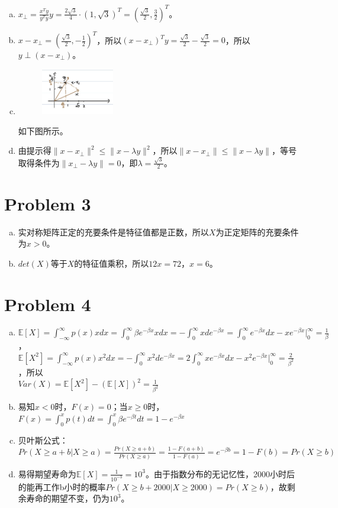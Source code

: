 \documentclass[a4paper,UTF8]{article}
\numberwithin{equation}{section}
\begin{document}
\begin{enumerate}[(a)]
	\item $x_{\perp}=\frac{x^Ty}{y^Ty}y=\frac{2\sqrt{3}}{4}\cdot(1,\sqrt{3})^T=(\frac{\sqrt{3}}{2},\frac{3}{2})^T$。
	\item $x-x_{\perp}=(\frac{\sqrt{3}}{2},-\frac{1}{2})^T$，所以$(x-x_{\perp})^Ty=\frac{\sqrt{3}}{2}-\frac{\sqrt{3}}{2}=0$，所以$y\perp (x-x_{\perp})$。
	\item \begin{figure}[b]
		\centering
		\includegraphics[width=0.3\textwidth]{1.jpg}
		\label{fig:1}
	\end{figure}
    如下图所示。
	\item 由提示得$\|x-x_{\perp}\|^2\leq \|x-\lambda y\|^2$，所以$\|x-x_{\perp}\|\leq \|x-\lambda y\|$，等号取得条件为$\|x_{\perp}-\lambda y\|=0$，即$\lambda=\frac{\sqrt{3}}{2}$。
\end{enumerate}


\section*{Problem 3}
\begin{enumerate}[(a)]
	\item 实对称矩阵正定的充要条件是特征值都是正数，所以$X$为正定矩阵的充要条件为$x>0$。
	\item $det(X)$等于$X$的特征值乘积，所以$12x=72$，$x=6$。
\end{enumerate}

\section*{Problem 4}
\begin{enumerate}[(a)]
	\item $\mathbb{E}[X]=\int_{-\infty}^{\infty}p(x)xdx=\int_{0}^{\infty}\beta e^{-\beta x }xdx=-\int_{0}^{\infty}xde^{-\beta x }=\int_{0}^{\infty}e^{-\beta x }dx-xe^{-\beta x }|_{0}^{\infty}=\frac{1}{\beta}$，\\
	$\mathbb{E}[X^2]=\int_{-\infty}^{\infty}p(x)x^2dx=-\int_{0}^{\infty}x^2de^{-\beta x }=2\int_{0}^{\infty}xe^{-\beta x }dx-x^2e^{-\beta x }|_{0}^{\infty}=\frac{2}{\beta^2}$，所以\\$Var(X)=\mathbb{E}[X^2]-(\mathbb{E}[X])^2=\frac{1}{\beta^2}$
	\item 易知$x<0$时，$F(x)=0$；当$x\geq0$时，$F(x)=\int_{0}^{x}p(t)dt=\int_{0}^{x}\beta e^{-\beta t}dt=1-e^{-\beta x}$
	\item 贝叶斯公式：$Pr(X\geq a+b| X\geq a)=\frac{Pr(X\geq a+b)}{Pr(X\geq a)}=\frac{1-F(a+b)}{1-F(a)}=e^{-\beta b}=1-F(b)=Pr(X\geq b)$
	\item 易得期望寿命为$\mathbb{E}[X]=\frac{1}{10^{-3}}=10^3$。由于指数分布的无记忆性，2000小时后的能再工作b小时的概率$Pr(X\geq b+2000|X\geq 2000)=Pr(X\geq b)$，故剩余寿命的期望不变，仍为$10^3$。
\end{enumerate}
\end{document}
